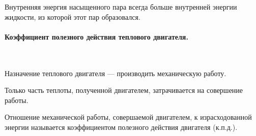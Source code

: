 \documentclass[a4paper,12pt]{article}
\begin{document}
		Внутренняя энергия насыщенного пара всегда больше внутренней энергии
		жидкости, из которой этот пар образовался.

		
		\paragraph{Коэффициент полезного действия теплового двигателя.} \

		Назначение теплового двигателя — производить механическую работу. 
		
		Только часть теплоты, полученной двигателем, затрачивается на совершение работы. 
		
		Отношение механической работы, совершаемой двигателем, к израсходованной энергии 
		называется коэффициентом полезного действия двигателя (к.п.д.).

		
\end{document}
